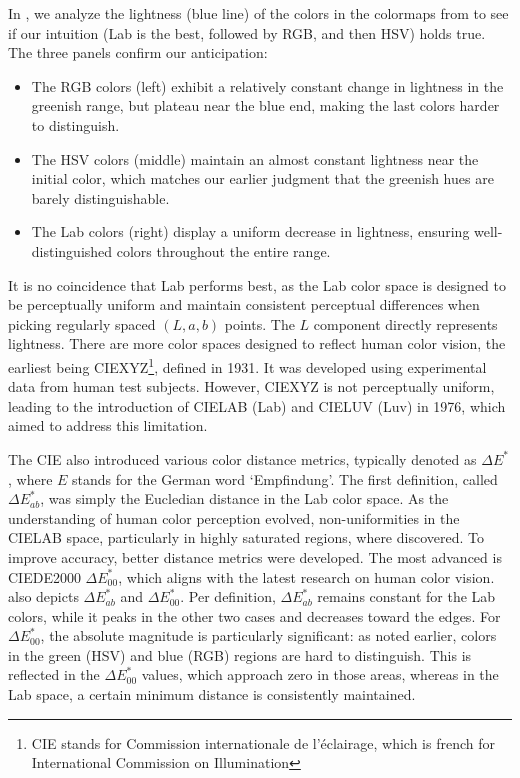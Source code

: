 In , we analyze the lightness (blue line) of the colors in the colormaps from  to see if our intuition (Lab is the best, followed by RGB, and then HSV) holds true.
The three panels confirm our anticipation:
\begin{itemize}
\item The RGB colors (left) exhibit a relatively constant change in lightness in the greenish range, but plateau near the blue end, making the last colors harder to distinguish.
\item The HSV colors (middle) maintain an almost constant lightness near the initial color, which matches our earlier judgment that the greenish hues are barely distinguishable.
\item The Lab colors (right) display a uniform decrease in lightness, ensuring well-distinguished colors throughout the entire range.
\end{itemize}

It is no coincidence that Lab performs best, as the Lab color space is designed to be perceptually uniform and maintain consistent perceptual differences when picking regularly spaced $(L,a,b)$ points. The $L$ component directly represents lightness. There are more color spaces designed to reflect human color vision, the earliest being CIEXYZ\footnote{CIE stands for Commission internationale de l'éclairage, which is french for International Commission on Illumination}, defined in 1931. It was developed using experimental data from human test subjects. However, CIEXYZ is not perceptually uniform, leading to the introduction of CIELAB (Lab) and CIELUV (Luv) in 1976, which aimed to address this limitation.

The CIE also introduced various color distance metrics, typically denoted as $\Delta E^*$, where $E$ stands for the German word `Empfindung'. The first definition, called $\Delta E^*_{ab}$, was simply the Eucledian distance in the Lab color space. As the understanding of human color perception evolved, non-uniformities in the CIELAB space, particularly in highly saturated regions, where discovered. To improve accuracy, better distance metrics were developed. The most advanced is CIEDE2000 $\Delta E^*_{00}$, which aligns with the latest research on human color vision. 
 also depicts $\Delta E^*_{ab}$ and $\Delta E^*_{00}$. 
Per definition, $\Delta E^*_{ab}$ remains constant for the Lab colors, while it peaks in the other two cases and decreases toward the edges. For $\Delta E^*_{00}$, the absolute magnitude is particularly significant: as noted earlier, colors in the green (HSV) and blue (RGB) regions are hard to distinguish. This is reflected in the $\Delta E^*_{00}$ values, which approach zero in those areas, whereas in the Lab space, a certain minimum distance is consistently maintained.



